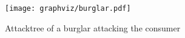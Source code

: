 \begin{figure}
\texttt{[image: graphviz/burglar.pdf]}
\caption{Attacktree of a burglar attacking the consumer}
\label{attacktree:burglar}
\end{figure}